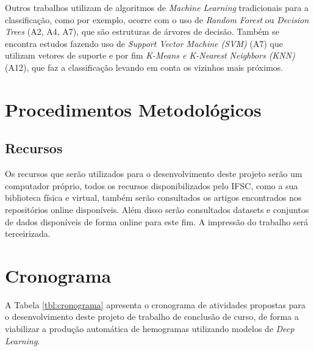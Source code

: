 Outros trabalhos utilizam de algoritmos de \emph{Machine Learning} tradicionais para a classificação, como por exemplo, ocorre com o uso de \emph{Random Forest} ou \emph{Decision Trees}  (A2, A4, A7), que são estruturas de árvores de decisão. Também se encontra estudos fazendo uso de \emph{Support Vector Machine (SVM)} (A7) que utilizam vetores de suporte e por fim \emph{K-Means e K-Nearest Neighbors (KNN)} (A12), que faz a classificação levando em conta os vizinhos mais próximos.

\chapter{Procedimentos Metodológicos}
\label{chap:metodologia}


\section{Recursos}
\label{chap:recursos}

Os recursos que serão utilizados para o desenvolvimento deste projeto serão um computador próprio, todos os recursos disponibilizados pelo IFSC, como a sua biblioteca física e virtual, também serão consultados os artigos encontrados nos repositórios online disponíveis. Além disso serão consultados datasets e conjuntos de dados disponíveis de forma online para este fim. A impressão do trabalho será terceirizada.

\chapter{Cronograma}
\label{chap:cronograma}

A Tabela \ref{tbl:cronograma} apresenta o cronograma de atividades propostas para o desenvolvimento deste projeto de trabalho de conclusão de curso, de forma a viabilizar a produção automática de hemogramas utilizando modelos de \emph{Deep Learning}.

